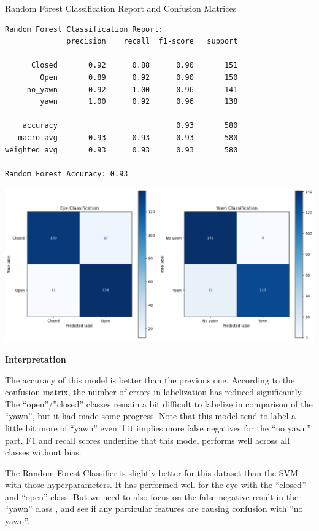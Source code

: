 \documentclass{modeleRapport}
\begin{document}
\begin{codebox}[OutputD]{ Random Forest Classification Report and Confusion Matrices}
\begin{lstlisting}
Random Forest Classification Report:
              precision    recall  f1-score   support

      Closed       0.92      0.88      0.90       151
        Open       0.89      0.92      0.90       150
     no_yawn       0.92      1.00      0.96       141
        yawn       1.00      0.92      0.96       138

    accuracy                           0.93       580
   macro avg       0.93      0.93      0.93       580
weighted avg       0.93      0.93      0.93       580

Random Forest Accuracy: 0.93
\end{lstlisting}

\includegraphics[width=14cm]{Images/RF_cm.png}

\end{codebox}

\textbf{Interpretation\\}

The accuracy of this model is better than the previous one.
According to the confusion matrix, the number of errors in labelization has reduced significantly.
The “open”/”closed” classes remain a bit difficult to labelize in comparison of the “yawn”, but it had made some progress. Note that this model tend to label a little bit more of “yawn” even if it implies more false negatives for the “no yawn” part.
F1 and recall scores underline that this model performs well across all classes without bias.

The Random Forest Classifier is slightly better for this dataset than the SVM with those hyperparameters. It has performed well for the eye with the “closed” and “open” class. But we need to also focus on the false negative result in the “yawn” class , and see if any particular features are causing confusion with “no yawn”.
\end{document}
